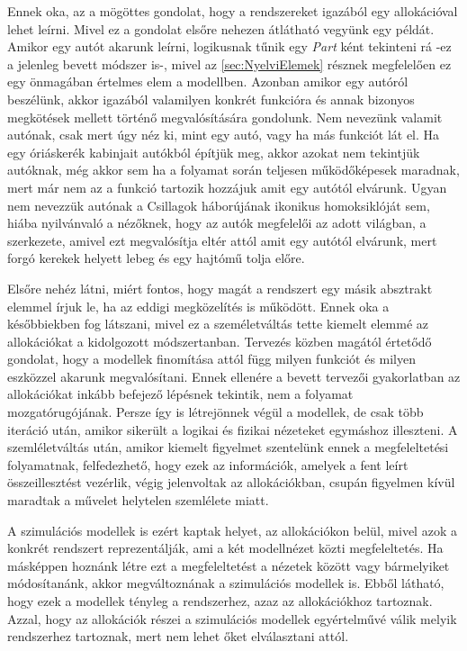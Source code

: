        Ennek oka, az a mögöttes gondolat, hogy a rendszereket igazából egy allokációval lehet leírni. Mivel ez a gondolat elsőre nehezen átlátható vegyünk egy példát.
        Amikor egy autót akarunk leírni, logikusnak tűnik egy \emph{Part} ként tekinteni rá -ez a jelenleg bevett módszer is-, mivel az \ref{sec:NyelviElemek} résznek megfelelően ez egy önmagában értelmes elem a modellben.
        Azonban amikor egy autóról beszélünk, akkor igazából valamilyen konkrét funkcióra és annak bizonyos megkötések mellett történő megvalósítására gondolunk.
        Nem nevezünk valamit autónak, csak mert úgy néz ki, mint egy autó, vagy ha más funkciót lát el. Ha egy óriáskerék kabinjait autókból építjük meg, akkor azokat nem tekintjük autóknak, még akkor sem ha a folyamat során teljesen működőképesek maradnak, mert már nem az a funkció tartozik hozzájuk amit egy autótól elvárunk.
        Ugyan nem nevezzük autónak a Csillagok háborújának ikonikus homoksiklóját sem, hiába nyilvánvaló a nézőknek, hogy az autók megfelelői az adott világban, a szerkezete, amivel ezt megvalósítja eltér attól amit egy autótól elvárunk, mert forgó kerekek helyett lebeg és egy hajtómű tolja előre.

        Elsőre nehéz látni, miért fontos, hogy magát a rendszert egy másik absztrakt elemmel írjuk le, ha az eddigi megközelítés is működött. Ennek oka a későbbiekben fog látszani, mivel ez a személetváltás tette kiemelt elemmé az allokációkat a kidolgozott módszertanban.
        Tervezés közben magától értetődő gondolat, hogy a modellek finomítása attól függ milyen funkciót és milyen eszközzel akarunk megvalósítani.
        Ennek ellenére a bevett tervezői gyakorlatban az allokációkat inkább befejező lépésnek tekintik, nem a folyamat mozgatórugójának. Persze így is létrejönnek végül a modellek, de csak több iteráció után, amikor sikerült a logikai és fizikai nézeteket egymáshoz illeszteni.
        A szemléletváltás után, amikor kiemelt figyelmet szentelünk ennek a megfeleltetési folyamatnak, felfedezhető, hogy ezek az információk, amelyek a fent leírt összeillesztést vezérlik, végig jelenvoltak az allokációkban, csupán figyelmen kívül maradtak a művelet helytelen szemlélete miatt.

        A szimulációs modellek is ezért kaptak helyet, az allokációkon belül, mivel azok a konkrét rendszert reprezentálják, ami a két modellnézet közti megfeleltetés.
        Ha másképpen hoznánk létre ezt a megfeleltetést a nézetek között vagy bármelyiket módosítanánk, akkor megváltoznának a szimulációs modellek is. Ebből látható, hogy ezek a modellek tényleg a rendszerhez, azaz az allokációkhoz tartoznak. Azzal, hogy az allokációk részei a szimulációs modellek egyértelművé válik melyik rendszerhez tartoznak, mert nem lehet őket elválasztani attól.

